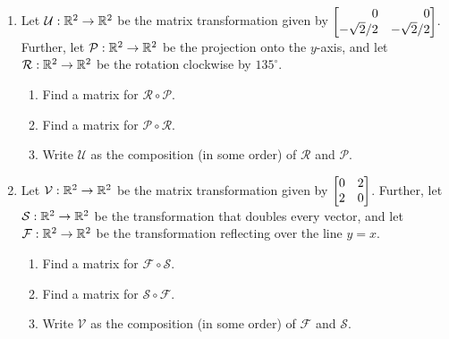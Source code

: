
\begin{exercises}

	\begin{problist}
		\prob
		\begin{enumerate}
			\item Let $\mathcal U:\mathbb{R}^{2}\to\mathbb{R}^{2}$ be the matrix transformation
				given by $\mat{0&0\\-\sqrt{2}/2 & -\sqrt{2}/2}$. Further,
				let $\mathcal P:\mathbb{R}^{2}\to\mathbb{R}^{2}$ be the projection onto
				the $y$-axis, and let $\mathcal R:\mathbb{R}^{2}\to\mathbb{R}^{2}$ be the rotation
				clockwise by $135^{\circ}$.
				\begin{enumerate}
					\item Find a matrix for $\mathcal R \circ \mathcal
						P$.

					\item Find a matrix for $\mathcal P \circ \mathcal
						R$.

					\item Write $\mathcal U$ as the composition (in some
						order) of $\mathcal R$ and $\mathcal P$.
				\end{enumerate}

			\item Let $\mathcal V:\mathbb{R}^{2}\to\mathbb{R}^{2}$ be the matrix transformation
				given by $\mat{0&2\\2&0}$. Further, let
				$\mathcal S:\mathbb{R}^{2}\to\mathbb{R}^{2}$ be the transformation that
				doubles every vector, and let $\mathcal F:\mathbb{R}^{2}\to\mathbb{R}^{2}$
				be the transformation reflecting over the line $y=x$.
				\begin{enumerate}
					\item Find a matrix for $\mathcal F \circ \mathcal
						S$.

					\item Find a matrix for $\mathcal S \circ \mathcal
						F$.

					\item Write $\mathcal V$ as the composition (in some
						order) of $\mathcal F$ and $\mathcal S$.
				\end{enumerate}
		\end{enumerate}


		\begin{solution}


\end{solution}
\end{problist}
\end{exercises}
